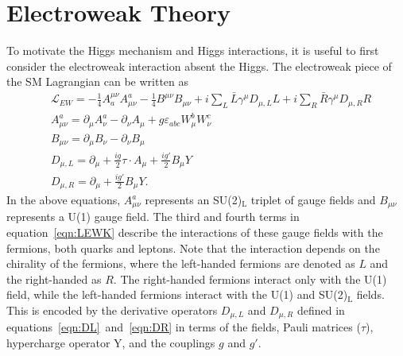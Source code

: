 \section{Electroweak Theory}
To motivate the Higgs mechanism and Higgs interactions, it is useful to first consider the electroweak interaction absent the Higgs. The electroweak piece of the 
SM Lagrangian can be written as 
\begin{align}
	& \mathcal{L}_{EW} = -\frac{1}{4}A_a^{\mu\nu}A^a_{\mu\nu} - \frac{1}{4}B^{\mu\nu}B_{\mu\nu} + i\sum_L \bar{L}\gamma^{\mu}D_{\mu,L}L + i\sum_R \bar{R}\gamma^{\mu}D_{\mu,R}R \label{eqn:LEWK}\\
	& A^a_{\mu\nu} = \partial_{\mu}A_{\nu}^{a} - \partial_{\nu}A_{\mu} + g\varepsilon_{abc}W^{b}_{\mu}W^{c}_{\nu} \\
	& B_{\mu\nu} = \partial_{\mu}B_{\nu} - \partial_{\nu}B_{\mu} \\
	& D_{\mu,L} = \partial_{\mu} + \frac{ig}{2}\tau\cdot A_{\mu} + \frac{ig'}{2}B_{\mu}Y \label{eqn:DL}\\
	& D_{\mu,R} = \partial_{\mu} + \frac{ig'}{2}B_{\mu}Y. \label{eqn:DR}
\end{align}
In the above equations, $A_{\mu\nu}^a$ represents an SU(2)$_{\mathrm{L}}$ triplet of gauge fields and $B_{\mu\nu}$ represents a U(1) gauge field. The third and fourth terms in equation~\ref{eqn:LEWK} 
describe the interactions of these gauge fields with the fermions, both quarks and leptons. Note that the interaction depends on the chirality of the fermions, where the left-handed 
fermions are denoted as $L$ and the right-handed as $R$. The right-handed fermions interact only with the U(1) field, while the left-handed fermions interact with the U(1) and SU(2)$_{\mathrm{L}}$ fields. 
This is encoded by the derivative operators $D_{\mu,L}$ and $D_{\mu,R}$ defined in equations~\ref{eqn:DL}~and~\ref{eqn:DR} in terms of the fields, Pauli matrices ($\tau$), hypercharge operator Y, and the couplings $g$ and $g'$. 

